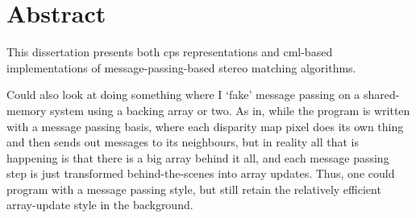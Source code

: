 

\chapter*{Abstract}

This dissertation presents both \gls{cps} representations and \gls{cml}-based implementations of message-passing-based stereo matching algorithms.

Could also look at doing something where I `fake' message passing on a shared-memory system using a backing array or two.  As in, while the program is written with a message passing basis, where each disparity map pixel does its own thing and then sends out messages to its neighbours, but in reality all that is happening is that there is a big array behind it all, and each message passing step is just transformed behind-the-scenes into array updates.  Thus, one could program with a message passing style, but still retain the relatively efficient array-update style in the background.